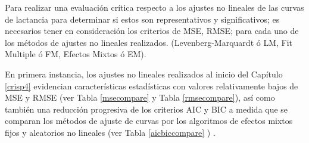 Para realizar una evaluación crítica respecto a los ajustes no lineales de las curvas de lactancia para determinar si estos son representativos y significativos; es necesarios tener en consideración los criterios de MSE, RMSE; para cada uno de los métodos de ajustes no lineales realizados. (Levenberg-Marquardt ó LM, Fit Multiple ó FM, Efectos Mixtos ó EM). \\


\begin{table}[h]
\centering
\caption{Comparación de la raíz del error cuadrático medio (RMSE) para cada método de ajuste no lineal.}
\label{rmsecompare}
\end{table}

En primera instancia, los ajustes no lineales realizados al inicio del Capítulo \ref{crisp4} evidencian características estadísticas con valores relativamente bajos de MSE y RMSE (ver Tabla \ref{msecompare} y Tabla \ref{rmsecompare}), así como también una reducción progresiva de los criterios AIC y BIC a medida que se comparan los métodos de ajuste de curvas por los algoritmos de efectos mixtos fijos y aleatorios no lineales (ver Tabla \ref{aicbiccompare} ) .\\

